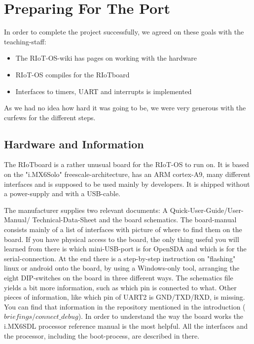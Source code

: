 \section{Preparing For The Port}

In order to complete the project successfully, we agreed on these goals with the
teaching-staff:

\begin{itemize}
\item The RIoT-OS-wiki has pages on working with the hardware
\item RIoT-OS compiles for the RIoTboard
\item Interfaces to timers, UART and interrupts is implemented
\end{itemize}

As we had no idea how hard it was going to be, we were very generous with the curfews
for the different steps.

\subsection{Hardware and Information}
The RIoTboard is a rather unusual board for the RIoT-OS to run on.
It is based on the "i.MX6Solo" freescale-architecture, has an ARM cortex-A9, many
different interfaces and is supposed to be used mainly by developers.
It is shipped without a power-supply and with a USB-cable.

The manufacturer supplies two relevant documents: A Quick-User-Guide/User-Manual/
Technical-Data-Sheet and the
board schematics.
The board-manual consists mainly of a list of interfaces with picture of where to find
them on the board. If you have physical access to the board, the only thing useful you
will learned from there is which mini-USB-port is for OpenSDA and which is for the
serial-connection.
At the end there is a step-by-step instruction on "flashing" linux or android onto the
board, by using a Windows-only tool, arranging the eight DIP-switches on the board in
three different ways.
The schematics file yields a bit more information, such as which pin is connected to
what.
Other pieces of information, like which pin of UART2 is GND/TXD/RXD, is missing.
You can find that information in the repository mentioned in the introduction
(\textit{$briefings/connect\_debug$}).
In order to understand the way the board works the i.MX6SDL processor reference manual is
the most helpful. All the interfaces and the processor, including the boot-process, are
described in there.

